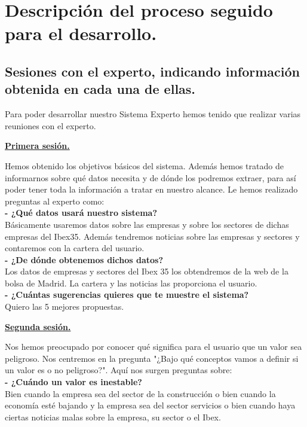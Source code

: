 \documentclass[12pt]{article}
\begin{document}
 
\newpage
\section{Descripción del proceso seguido para el desarrollo. }
\subsection{Sesiones con el experto, indicando información obtenida en cada una de ellas.}
Para poder desarrollar nuestro Sistema Experto hemos tenido que realizar varias reuniones con el experto. 

\begin{center}
	\underline{\textbf{Primera sesión.}}
\end{center}

Hemos obtenido los objetivos básicos del sistema. Además hemos tratado de informarnos sobre qué datos necesita y de dónde los podremos extraer, para así poder tener toda la información a tratar en nuestro alcance. Le hemos realizado preguntas al experto como:\\

\textbf{- ¿Qué datos usará nuestro sistema?}\\
Básicamente usaremos datos sobre las empresas y sobre los sectores de dichas empresas del Ibex35. Además tendremos noticias sobre las empresas y sectores y contaremos con la cartera del usuario. \\

\textbf{- ¿De dónde obtenemos dichos datos?}\\
Los datos de empresas y sectores del Ibex 35 los obtendremos de la web de la bolsa de Madrid. La cartera y las noticias las proporciona el usuario. \\

\textbf{- ¿Cuántas sugerencias quieres que te muestre el sistema?}\\
Quiero las 5 mejores propuestas. \\

\begin{center}
	\underline{\textbf{Segunda sesión.}}
\end{center}

Nos hemos preocupado por conocer qué significa para el usuario que un valor sea peligroso. Nos centremos en la pregunta "¿Bajo qué conceptos vamos a definir si un valor es o no peligroso?". Aquí nos surgen preguntas sobre:\\

\textbf{- ¿Cuándo un valor es inestable?}\\
Bien cuando la empresa sea del sector de la construcción o bien cuando la economía esté bajando y la empresa sea del sector servicios o bien cuando haya ciertas noticias malas sobre la empresa, su sector o el Ibex. \\
\end{document}
